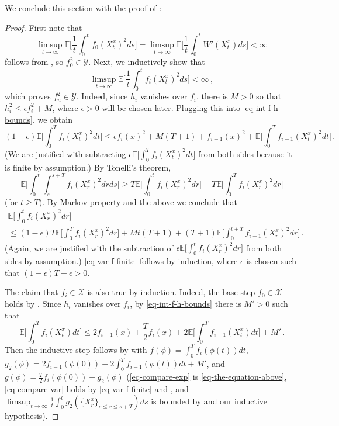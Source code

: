 \documentclass[final]{amsart}
\numberwithin{thm}{section}
\numberwithin{equation}{section}
\newcommand{\E}{\mathbb{E}}
\newcommand{\X}{\mathcal{X}}
\newcommand{\Y}{\mathcal{Y}}
\begin{document}
We conclude this section with the proof of :
\begin{proof}
    First note that
    $$\limsup_{t \to \infty} \E\Big[\frac{1}{t}\int_0^t f_0(X_t^x)^2 ds\Big] = \limsup_{t \to \infty} \E\Big[\frac{1}{t}\int_0^t W'(X_t^x) ds\Big] < \infty$$
    follows from \cite[Lemma 4.1]{extinction}, so $f_0^2 \in \Y$. Next,  we  inductively show that
    \begin{equation}\label{eq-var-f-finite}
        \limsup_{t \to \infty} \E\Big[\frac{1}{t}\int_0^t f_i(X_t^x)^2 ds\Big] < \infty \,,
    \end{equation}
    which proves $f_n^2 \in \Y$.
    Indeed, since $h_i$ vanishes over $f_i$, there is 
    $M > 0$ so that $h_i^2 \leq \epsilon f_i^2 + M$, where $\epsilon > 0$ will be chosen later. Plugging this into \eqref{eq-int-f-h-bounds}, we obtain
    $$(1-\epsilon)\E\Big[\int_0^T f_i(X_t^x)^2dt\Big] \leq \epsilon f_i(x)^2 + M(T+1) + f_{i-1}(x)^2 + \E\Big[\int_0^T f_{i-1}(X_t^x)^2dt\Big] \,.$$
    (We are justified with subtracting  $\epsilon \E\Big[\int_0^T f_i(X_t^x)^2dt\Big]$ from both sides because it is finite by assumption.) By Tonelli's theorem,
    $$\E\Big[\int_0^t\int_s^{s+T} f_i(X_r^x)^2drds\Big] \geq T\E\Big[\int_0^t f_i(X_r^x)^2dr\Big] - T\E\Big[\int_0^T f_i(X_r^x)^2dr\Big]$$
    (for $t \geq T$). By Markov property and the above we conclude that
    \begin{multline*}
    [(1-\epsilon)T - \epsilon]\E\Big[\int_0^t f_i(X_r^x)^2dr\Big] \\
    \leq (1-\epsilon)T\E\Big[\int_0^T f_i(X_r^x)^2dr\Big] + Mt(T+1) + (T+1)\E\Big[\int_0^{t+T} f_{i-1}(X_r^x)^2dr\Big] \,.
    \end{multline*}
    (Again, we are justified with the subtraction of $\epsilon \E\Big[\int_0^t f_i(X_r^x)^2dr\Big]$ from both sides by assumption.) \eqref{eq-var-f-finite} follows by induction, where $\epsilon$ is chosen such that $(1-\epsilon)T - \epsilon > 0$.
    
    
    

    
    The claim that $f_i \in \X$ is also true by induction. Indeed, the base step $f_0 \in \X$ holds by . Since $h_i$ vanishes over $f_i$, by \eqref{eq-int-f-h-bounds} there is $M' > 0$ such that
    \begin{equation}\label{eq-the-equation-above}
        \E\Big[\int_0^T f_i(X_t^x)dt\Big] \leq 2f_{i-1}(x) +\frac{T}{2}f_i(x)+ 2\E\Big[\int_0^T f_{i-1}(X_t^x)dt\Big] + M' \,.
    \end{equation}
    Then the inductive step follows by  with $f(\phi) = \int_0^T f_i(\phi(t))dt$, $g_2(\phi) = 2f_{i-1}(\phi(0)) + 2\int_0^T f_{i-1}(\phi(t))dt + M'$, and $g(\phi) = \frac{T}{2}f_i(\phi(0)) + g_2(\phi)$ (\eqref{eq-compare-exp} is \eqref{eq-the-equation-above}, \eqref{eq-compare-var} holds by \eqref{eq-var-f-finite} and , and $\limsup_{t \to \infty} \frac{1}{t}\int_0^t g_2(\{X_r^x\}_{s\leq r \leq s+T})ds$ is bounded by  and our inductive hypothesis).
\end{proof}
\end{document}
